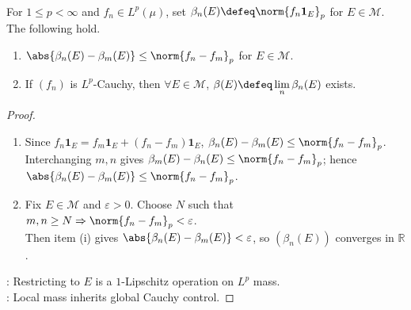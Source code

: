 \begin{proposition} \label{prop:lp-cauchy-local-mass-limits} \\
For $1\leq p<\infty$ and $f_n\in L^p(\mu)$, set $\beta_n(E)\defeq\norm{f_n\mathbf 1_E}_p$ for $E\in\mathcal M$.
The following hold.
\begin{enumerate}[label=(\roman*)]
\setlength{\itemsep}{0pt}
\item $\abs{\beta_n(E)-\beta_m(E)}\leq\norm{f_n-f_m}_p$ for $E\in\mathcal M$.
\item If $(f_n)$ is $L^p$-Cauchy, then $\forall E\in\mathcal M$, $\beta(E)\defeq\lim\limits_n\beta_n(E)$ exists.
\end{enumerate}
\begin{proof}
\begin{enumerate}[label=(\roman*)]
\setlength{\itemsep}{0pt}
\item Since $f_n\mathbf 1_E=f_m\mathbf 1_E+(f_n-f_m)\mathbf 1_E$, $\beta_n(E)-\beta_m(E)\leq\norm{f_n-f_m}_p$.\\
Interchanging $m,n$ gives $\beta_m(E)-\beta_n(E)\leq\norm{f_n-f_m}_p$; hence $\abs{\beta_n(E)-\beta_m(E)}\leq\norm{f_n-f_m}_p$.
\item Fix $E\in\mathcal M$ and $\varepsilon>0$. Choose $N$ such that $m,n\geq N\Rightarrow\norm{f_n-f_m}_p<\varepsilon$.\\
Then item (i) gives $\abs{\beta_n(E)-\beta_m(E)}<\varepsilon$, so $(\beta_n(E))$ converges in $\mathbb R$.
\end{enumerate}
: Restricting to $E$ is a $1$-Lipschitz operation on $L^p$ mass.\\
: Local mass inherits global Cauchy control.
\end{proof}
\end{proposition}

